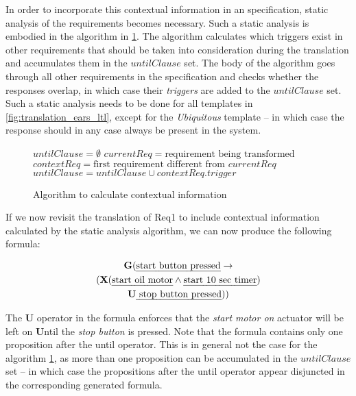 In order to incorporate this contextual information in an \ltl specification,
static analysis of the \ears requirements becomes necessary. Such a static
analysis is embodied in the algorithm in \fig\ref{algo:staticanalysis}. The
algorithm calculates which triggers exist in other \ears requirements that
should be taken into consideration during the translation and accumulates them
in the $untilClause$ set. The body of the algorithm goes through all other
requirements in the specification and checks whether the responses overlap, in
which case their \emph{triggers} are added to the $untilClause$ set. Such
a static analysis needs to be done for all \ears templates in
\tab\ref{fig:translation_ears_ltl}, except for the \emph{Ubiquitous} template --
in which case the response should in any case always be present in the system.

\begin{figure}
\begin{algorithmic}
	\STATE $untilClause = \emptyset$
	\STATE $currentReq = \text{requirement being transformed}$
	\STATE $contextReq = \text{first requirement different from } currentReq$
    	        \STATE $untilClause = untilClause \cup {contextReq.trigger}$
    	\ENDIF
	\ENDWHILE
	\caption{Algorithm to calculate contextual information}
	\label{algo:staticanalysis}
\end{algorithmic}
\end{figure}

If we now revisit the translation of \textsf{Req1} to include contextual
information calculated by the static analysis algorithm, we can now produce the
following \ltl formula:

\begin{multline*} 
\mathbf{G}(\text{\emph{start button pressed}} \rightarrow\\
(\mathbf{X}(\text{\emph{start oil motor}}\land \text{\emph{start 10 sec
timer}})\\ \mathbf{U} \text{\emph{ stop button pressed}}))
\end{multline*}

The $\mathbf{U}$ operator in the formula enforces that the \emph{start motor on}
actuator will be left on $\mathbf{U}$ntil the \emph{stop button} is pressed.
Note that the \ltl formula contains only one proposition after the until operator.
This is in general not the case for the algorithm \fig\ref{algo:staticanalysis},
as more than one proposition can be accumulated in the $untilClause$ set -- in
which case the propositions after the until operator appear disjuncted in
the corresponding generated \ltl formula.

% 
